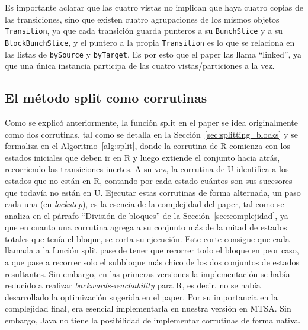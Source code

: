 Es importante aclarar que las cuatro vistas no implican que haya cuatro copias de las transiciones, sino que existen cuatro agrupaciones de los mismos objetos \texttt{Transition}, ya que cada transición guarda punteros a su \texttt{BunchSlice} y a su \texttt{BlockBunchSlice}, y el puntero a la propia \texttt{Transition} es lo que se relaciona en las listas de \texttt{bySource} y \texttt{byTarget}. Es por esto que el paper las llama ``linked'', ya que una única instancia participa de las cuatro vistas/particiones a la vez.

\subsection{El método split como corrutinas}
\label{sec:corrutinas}
Como se explicó anteriormente, la función split en el paper se idea originalmente como dos corrutinas, tal como se detalla en la Sección~\ref{sec:splitting_blocks} y se formaliza en el Algoritmo~\ref{alg:split}, donde la corrutina de R comienza con los estados iniciales que deben ir en R y luego extiende el conjunto hacia atrás, recorriendo las transiciones inertes. A su vez, la corrutina de U identifica a los estados que no están en R, contando por cada estado cuántos son sus sucesores que todavía no están en U. Ejecutar estas corrutinas de forma alternada, un paso cada una (en \textit{lockstep}), es la esencia de la complejidad del paper, tal como se analiza en el párrafo ``División de bloques'' de la Sección~\ref{sec:complejidad}, ya que en cuanto una corrutina agrega a su conjunto más de la mitad de estados totales que tenía el bloque, se corta su ejecución. Este corte consigue que cada llamada a la función split pase de tener que recorrer todo el bloque en peor caso, a que pase a recorrer solo el subbloque más chico de los dos conjuntos de estados resultantes. Sin embargo, en las primeras versiones la implementación se había reducido a realizar \textit{backwards-reachability} para R, es decir, no se había desarrollado la optimización sugerida en el paper. Por su importancia en la complejidad final, era esencial implementarla en nuestra versión en MTSA. Sin embargo, Java no tiene la posibilidad de implementar corrutinas de forma nativa.

